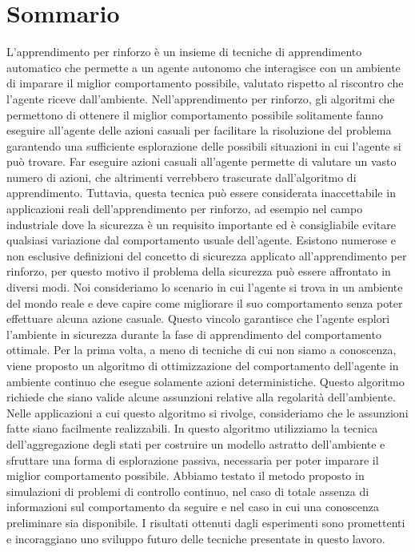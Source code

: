 \chapter*{Sommario}
\sloppy L'apprendimento per rinforzo è un insieme di tecniche di apprendimento automatico che permette a un agente autonomo che interagisce con un ambiente di imparare il miglior comportamento possibile, valutato rispetto al riscontro che l'agente riceve dall'ambiente. Nell'apprendimento per rinforzo, gli algoritmi che permettono di ottenere il miglior comportamento possibile solitamente fanno eseguire all'agente delle azioni casuali per facilitare la risoluzione del problema garantendo una sufficiente esplorazione delle possibili situazioni in cui l'agente si può trovare. Far eseguire azioni casuali all'agente permette di valutare un vasto numero di azioni, che altrimenti verrebbero trascurate dall'algoritmo di apprendimento. Tuttavia, questa tecnica può essere considerata inaccettabile in applicazioni reali dell'apprendimento per rinforzo, ad esempio nel campo industriale dove la sicurezza è un requisito importante ed è consigliabile evitare qualsiasi variazione dal comportamento usuale dell'agente. Esistono numerose e non esclusive definizioni del concetto di sicurezza applicato all'apprendimento per rinforzo, per questo motivo il problema della sicurezza può essere affrontato in diversi modi. Noi consideriamo lo scenario in cui l'agente si trova in un ambiente del mondo reale e deve capire come migliorare il suo comportamento senza poter effettuare alcuna azione casuale. Questo vincolo garantisce che l'agente esplori l'ambiente in sicurezza durante la fase di apprendimento del comportamento ottimale. Per la prima volta, a meno di tecniche di cui non siamo a conoscenza, viene proposto un algoritmo di ottimizzazione del comportamento dell'agente in ambiente continuo che esegue solamente azioni deterministiche. Questo algoritmo richiede che siano valide alcune assunzioni relative alla regolarità dell'ambiente. Nelle applicazioni a cui questo algoritmo si rivolge, consideriamo che le assunzioni fatte siano facilmente realizzabili. In questo algoritmo utilizziamo la tecnica dell'aggregazione degli stati per costruire un modello astratto dell'ambiente e sfruttare una forma di esplorazione passiva, necessaria per poter imparare il miglior comportamento possibile. Abbiamo testato il metodo proposto in simulazioni di problemi di controllo continuo, nel caso di totale assenza di informazioni sul comportamento da seguire e nel caso in cui una conoscenza preliminare sia disponibile. I risultati ottenuti dagli esperimenti sono promettenti e incoraggiano uno sviluppo futuro delle tecniche presentate in questo lavoro.

\endgroup